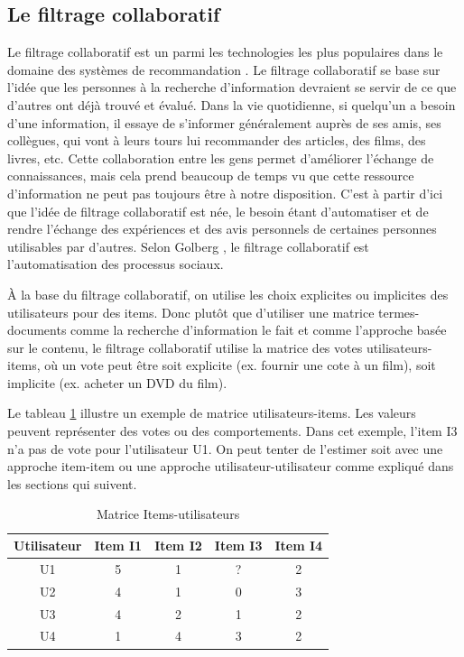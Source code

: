 \subsection{Le filtrage collaboratif}
Le filtrage collaboratif est un parmi les technologies les plus populaires dans le domaine des systèmes de recommandation \cite{Herlocker2000}. Le filtrage collaboratif se base sur l’idée que les personnes à la recherche d’information devraient se servir de ce que d’autres ont déjà trouvé et évalué. Dans la vie quotidienne, si quelqu’un a besoin d’une information, il essaye de s’informer généralement auprès de ses amis, ses collègues, qui vont à leurs tours lui recommander des articles, des films, des livres, etc. Cette collaboration entre les gens permet d’améliorer l’échange de connaissances, mais cela prend beaucoup de temps vu que cette ressource d’information ne peut pas toujours être à notre disposition. C’est à partir d’ici que l’idée de filtrage collaboratif est née, le besoin étant d’automatiser et de rendre l’échange des expériences et des avis personnels de certaines personnes utilisables par d’autres. Selon Golberg \cite{Golberg2001}, le filtrage collaboratif est l’automatisation des processus sociaux.

À la base du filtrage collaboratif, on utilise les choix explicites ou implicites des utilisateurs pour des items. Donc plutôt que d’utiliser une matrice termes-documents comme la recherche d’information le fait et comme l’approche basée sur le contenu, le filtrage collaboratif utilise la matrice des votes utilisateurs-items, où un vote peut être soit explicite (ex. fournir une cote à un film), soit implicite (ex. acheter un DVD du film).

Le tableau \ref{tab:matrice} illustre un exemple de matrice utilisateurs-items. Les valeurs peuvent représenter des votes ou des comportements. Dans cet exemple, l’item I3 n’a pas de vote pour l’utilisateur U1. On peut tenter de l’estimer soit avec une approche item-item ou une approche utilisateur-utilisateur comme expliqué dans les sections qui suivent.

\begin{table}[h!]
\centering
\caption{Matrice Items-utilisateurs}
\label{tab:matrice}
\begin{tabular}{|c|c|c|c|c|}
\hline
Utilisateur & Item I1 & Item I2 & Item I3 & Item I4 \\ \hline
U1         & 5       & 1       & ?       & 2       \\ \hline
U2         & 4       & 1       & 0       & 3       \\ \hline
U3         & 4       & 2       & 1       & 2       \\ \hline
U4         & 1       & 4       & 3       & 2       \\ \hline
\end{tabular}
\end{table}

